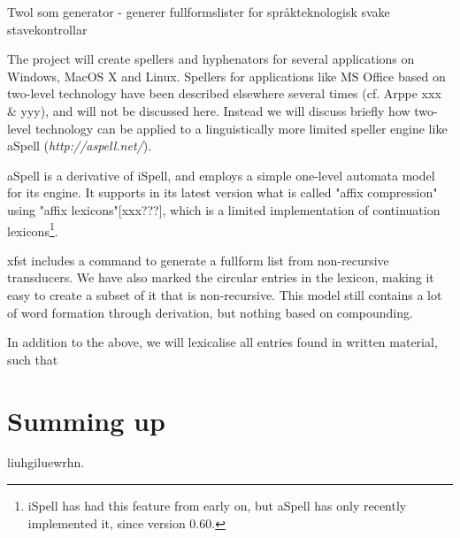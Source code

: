 \documentclass[a4paper,english]{article}
\begin{document}
Twol som generator - generer fullformslister for språkteknologisk svake stavekontrollar

The project will create spellers and hyphenators for several applications on Windows, MacOS X and Linux. Spellers for applications like MS Office based on two-level technology have been described elsewhere several times (cf. Arppe xxx \& yyy), and will not be discussed here. Instead we will discuss briefly how two-level technology can be applied to a linguistically more limited speller engine like aSpell (\textit{http://aspell.net/}).

aSpell is a derivative of iSpell, and employs a simple one-level automata model for its engine. It supports in its latest version what is called "affix compression" using "affix lexicons"[xxx???], which is a limited implementation of continuation lexicons\footnote{iSpell has had this feature from early on, but aSpell has only recently implemented it, since version 0.60.}.

xfst includes a command to generate a fullform list from non-recursive transducers. We have also marked the circular entries in the lexicon, making it easy to create a subset of it that is non-recursive. This model still contains a lot of word formation through derivation, but nothing based on compounding.

In addition  to the above, we will lexicalise all entries found in written material, such that

\section{Summing up}

liuhgiluewrhn.

 



\end{document}
